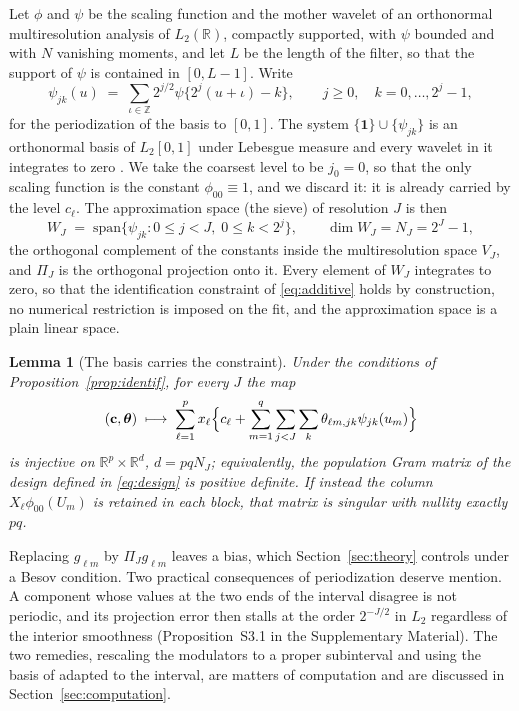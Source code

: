 \documentclass[12pt]{article} %
\newtheorem{lemma}{Lemma}
\theoremstyle{definition}
\newcommand{\R}{\mathbb{R}}
\newcommand{\cv}{\ell}
\newcommand{\md}{m}
\newcommand{\lev}{j}
\newcommand{\tsl}{k}
\newcommand{\jzero}{j_{0}}
\newcommand{\NJ}{N_{J}}
\newcommand{\lvl}[1]{c_{#1}}
\newcommand{\gcomp}[2]{g_{#1#2}}
\newcommand{\wav}[2]{\psi_{#1#2}}
\newcommand{\VJ}{V_{J}}
\newcommand{\WJ}{W_{J}}
\newcommand{\PiJ}{\Pi_{J}}
\newcommand{\coef}[4]{\theta_{#1#2,#3#4}}
\newcommand{\btheta}{\boldsymbol{\theta}}
\newcommand{\bc}{\mathbf{c}}
\begin{document}
Let $\phi$ and $\psi$ be the scaling function and the mother wavelet of an
orthonormal multiresolution analysis of $L_2(\R)$, compactly supported, with
$\psi$ bounded and with $N$ vanishing moments, and let $L$ be the length of
the filter, so that the support of $\psi$ is contained in $[0,L-1]$. Write
\begin{equation}
  \label{eq:periodized}
  \wav{\lev}{\tsl}(u) \;=\; \sum_{\iota \in \mathbb{Z}}
  2^{\lev/2}\psi\{2^{\lev}(u+\iota) - \tsl\},
  \qquad \lev \ge 0, \quad \tsl = 0,\dots,2^{\lev}-1,
\end{equation}
for the periodization of the basis to $[0,1]$. The system
$\{\mathbf{1}\}\cup\{\wav{\lev}{\tsl}\}$ is an orthonormal basis of
$L_2[0,1]$ under Lebesgue measure and every wavelet in it integrates to zero
\citep[Section 9.3]{Daubechies-1992}. We take the coarsest level to be
$\jzero = 0$, so that the only scaling function is the constant
$\phi_{00}\equiv 1$, and we discard it: it is already carried by the level
$\lvl{\cv}$. The \textcolor{colR1}{approximation space (the sieve)} of resolution $J$ is then
\[
  \WJ \;=\; \mathrm{span}\{\wav{\lev}{\tsl} : 0 \le \lev < J,\;
  0 \le \tsl < 2^{\lev}\},
  \qquad \dim \WJ = \NJ = 2^{J}-1,
\]
the orthogonal complement of the constants inside the multiresolution space
$\VJ$, and $\PiJ$ is the orthogonal projection onto it. Every element of $\WJ$
integrates to zero, so that the identification constraint of
\eqref{eq:additive} holds by construction, no numerical restriction is imposed
on the fit, and the \textcolor{colR1}{approximation space} is a plain linear space.

\begin{lemma}[The basis carries the constraint]
\label{lem:basis}
Under the conditions of Proposition~\ref{prop:identif}, for every $J$ the map
\[
  (\bc, \btheta) \;\longmapsto\;
  \sum_{\cv=1}^{p} x_{\cv}\Bigl\{\lvl{\cv} + \sum_{\md=1}^{q}
  \sum_{\lev<J}\sum_{\tsl} \coef{\cv}{\md}{\lev}{\tsl}
  \wav{\lev}{\tsl}(u_{\md})\Bigr\}
\]
is injective on $\R^{p}\times\R^{d}$, $d = pq\NJ$; equivalently, the
population Gram matrix of the design defined in \eqref{eq:design} is positive
definite. If instead the column $X_{\cv}\phi_{00}(U_{\md})$ is retained in
each block, that matrix is singular with nullity exactly $pq$.
\end{lemma}

Replacing $\gcomp{\cv}{\md}$ by $\PiJ\gcomp{\cv}{\md}$ leaves a bias, which
Section~\ref{sec:theory} controls under a Besov condition. Two practical
consequences of periodization deserve mention. A component whose values at the
two ends of the interval disagree is not periodic, and its projection error
then stalls at the order $2^{-J/2}$ in $L_2$ regardless of the interior
smoothness (Proposition~S3.1 in the Supplementary Material). The two remedies,
rescaling the modulators to a proper subinterval and using the basis of
\citet*{cohen1993wavelets} adapted to the interval, are matters of computation
and are discussed in Section~\ref{sec:computation}.
\end{document}
